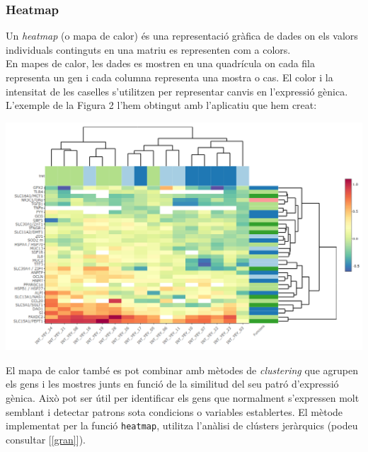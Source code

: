 \documentclass[english]{article}
\begin{document}
\subsubsection{Heatmap}
\label{2.4.1}
Un \textit{heatmap} (o mapa de calor) és una representació gràfica de dades on els valors individuals continguts en una matriu es representen com a colors.
\\

En mapes de calor, les dades es mostren en una quadrícula on cada fila representa un gen i cada columna representa una mostra o cas. El color i la intensitat de les caselles s'utilitzen per representar canvis en l'expressió gènica.
\\

L'exemple de la Figura 2 l'hem obtingut amb l'aplicatiu que hem creat:
\begin{center}
\includegraphics[scale=0.2]{heatmap.png}
\end{center}

El mapa de calor també es pot combinar amb mètodes de \textit{clustering} que agrupen els gens i les mostres junts en funció de la similitud del seu patró d'expressió gènica. Això pot ser útil per identificar els gens que normalment s'expressen molt semblant i detectar patrons sota condicions o variables establertes. El mètode implementat per la funció \texttt{heatmap}, utilitza l'anàlisi de clústers jeràrquics (podeu consultar [\ref{gran}]).
\\
\end{document}
